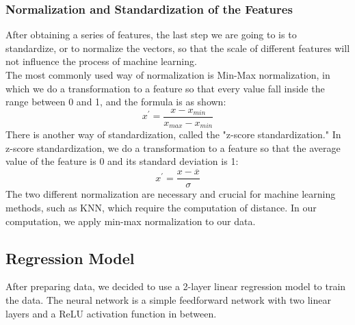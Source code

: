 \documentclass[UTF8]{mcmthesis}
\begin{document}
	\subsubsection{Normalization and Standardization of the Features}
	After obtaining a series of features, the last step we are going to is to standardize, or to normalize the vectors, so that the scale of different features will not influence the process of machine learning.\\
	The most commonly used way of normalization is Min-Max normalization, in which we do a transformation to a feature so that every value fall inside the range between 0 and 1, and the formula is as shown:\\
	\begin{equation*}
	    x^{'}=\frac{x-x_{min}}{x_{max}-x_{min}}
	\end{equation*}
	There is another way of standardization, called the "z-score standardization." In z-score standardization, we do a transformation to a feature so that the average value of the feature is 0 and its standard deviation is 1:
	\begin{equation*}
	    x^{'}=\frac{x-\overline{x}}{\sigma}
	\end{equation*}
	The two different normalization are necessary and crucial for machine learning methods, such as KNN, which require the computation of distance. In our computation, we apply min-max normalization to our data.
	
	
	
	
	\subsection{Regression Model}
	After preparing data, we decided to use a 2-layer linear regression model to train the data. The neural network is a simple feedforward network with two linear layers and a ReLU activation function in between.
	
\end{document}
